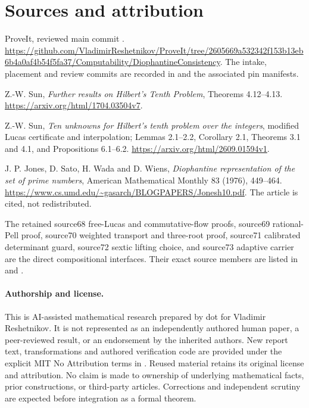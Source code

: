 \section{Sources and attribution}
\begin{enumerate}[label={[\arabic*]}]
\item ProveIt, reviewed main commit
.
\url{https://github.com/VladimirReshetnikov/ProveIt/tree/2605669a532342f153b13eb6b4a0af4b54f5fa37/Computability/DiophantineConsistency}.
The intake, placement and review commits are recorded in
 and the associated pin manifests.
\item Z.-W. Sun, \emph{Further results on Hilbert's Tenth Problem},
Theorems 4.12--4.13.
\url{https://arxiv.org/html/1704.03504v7}.
\item Z.-W. Sun, \emph{Ten unknowns for Hilbert's tenth problem over the
integers}, modified Lucas certificate and interpolation; Lemmas 2.1--2.2,
Corollary 2.1, Theorems 3.1 and 4.1, and Propositions 6.1--6.2.
\url{https://arxiv.org/html/2609.01594v1}.
\item J. P. Jones, D. Sato, H. Wada and D. Wiens,
\emph{Diophantine representation of the set of prime numbers},
American Mathematical Monthly 83 (1976), 449--464.
\url{https://www.cs.umd.edu/~gasarch/BLOGPAPERS/Jonesh10.pdf}.
The article is cited, not redistributed.
\item The retained source68 free-Lucas and commutative-flow proofs,
source69 rational-Pell proof, source70 weighted transport and three-root
proof, source71 calibrated determinant guard, source72 sextic lifting
choice, and source73 adaptive carrier are the direct compositional
interfaces. Their exact source members are listed in
 and .
\end{enumerate}

\paragraph{Authorship and license.}
This is AI-assisted mathematical research prepared by dot for Vladimir
Reshetnikov. It is not represented as an independently authored human
paper, a peer-reviewed result, or an endorsement by the inherited authors.
New report text, transformations and authored verification code are
provided under the explicit MIT No Attribution terms in
. Reused material retains its original license and
attribution. No claim is made to ownership of underlying mathematical
facts, prior constructions, or third-party articles. Corrections and
independent scrutiny are expected before integration as a formal theorem.
